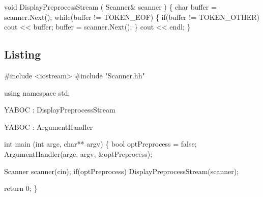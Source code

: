 \nwenddocs{}\endmoddef\nwstartdeflinemarkup\nwenddeflinemarkup
void DisplayPreprocessStream ( Scanner& scanner ) \{
        char buffer = scanner.Next();
        while(buffer != TOKEN_EOF) \{
                if(buffer != TOKEN_OTHER) cout << buffer;
                buffer = scanner.Next();
        \}
        cout << endl;
\}
\nwendcode{}\nwdocspar

\subsection{Listing}
\nwenddocs{}\endmoddef\nwstartdeflinemarkup\nwenddeflinemarkup
#include <iostream>
#include "Scanner.hh"

using namespace std;

\LA{}YABOC : DisplayPreprocessStream\RA{}

\LA{}YABOC : ArgumentHandler\RA{}

int main (int argc, char** argv) \{
        bool optPreprocess = false;
        ArgumentHandler(argc, argv, &optPreprocess);    

        Scanner scanner(cin);
        if(optPreprocess) DisplayPreprocessStream(scanner);

        return 0;
\}
\nwendcode{}\nwdocspar

\nwenddocs{}\endmoddef\nwstartdeflinemarkup\nwenddeflinemarkup
\nwendcode{}\nwdocspar
\nwenddocs{}
